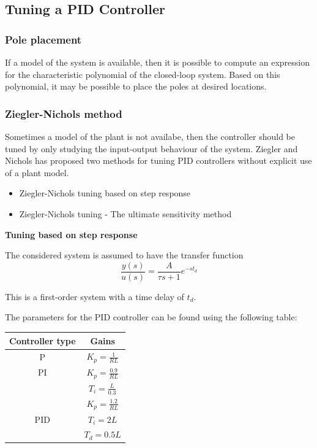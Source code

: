\subsection{Tuning a PID Controller}
\subsubsection{Pole placement}

If a model of the system is available, then it is possible to compute an expression
for the characteristic polynomial of the closed-loop system. Based on this polynomial,
it may be possible to place the poles at desired locations.

\subsubsection{Ziegler-Nichols method}

Sometimes a model of the plant is not availabe, then the controller should be tuned
by only studying the input-output behaviour of the system.
Ziegler and Nichols has proposed two methods for tuning PID controllers without
explicit use of a plant model.

\begin{itemize}
	\item{Ziegler-Nichols tuning based on step response}
	\item{Ziegler-Nichols tuning - The ultimate sensitivity method}
\end{itemize}


\textbf{Tuning based on step response}

The considered system is assumed to have the transfer function
$$\frac{y(s)}{u(s)} = \frac{A}{\tau s + 1} e^{-st_d}$$

This is a first-order system with a time delay of $t_d$.

The parameters for the PID controller can be found using the following table:
\begin{table}[h]
	\centering
	\begin{tabular}{|c|c|}
		\hline
		\cellcolor[HTML]{C0C0C0} \textbf{Controller type} & \cellcolor[HTML]{C0C0C0}\textbf{Gains} \\ \hline
		P                                                 & $K_p=\frac{1}{RL}$                     \\ \hline
		PI                                                & $K_p=\frac{0.9}{RL}$                   \\
		                                                  & $T_i=\frac{L}{0.3}$                    \\ \hline
		                                                  & $K_p=\frac{1.2}{RL}$                   \\
		PID                                               & $T_i=2L$                               \\
		                                                  & $T_d=0.5L$                             \\ \hline
	\end{tabular}
\end{table}

